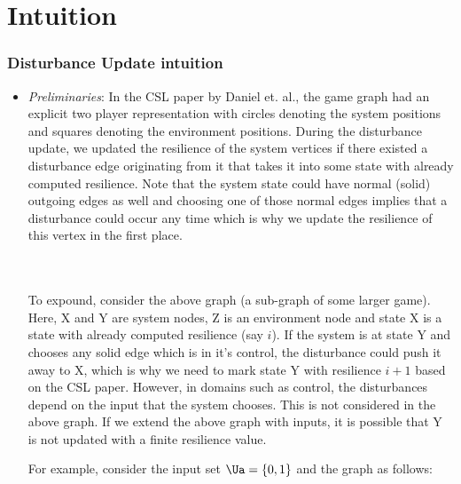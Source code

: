 \clearpage
\section{Intuition}
\subsubsection{Disturbance Update intuition}
\begin{itemize}	
\item \emph{Preliminaries}:
In the CSL paper by Daniel et. al., the game graph had an explicit two player representation with circles denoting the system positions and squares denoting the environment positions. During the disturbance update, we updated the resilience of the system vertices if there existed a disturbance edge originating from it that takes it into some state with already computed resilience. Note that the system state could have normal (solid) outgoing edges as well and choosing one of those normal edges implies that a disturbance could occur any time which is why we update the resilience of this vertex in the first place.
\\
\\ \\
To expound, consider the above graph (a sub-graph of some larger game). Here, X and Y are system nodes, Z is an environment node and state X is a state with already computed resilience (say $i$). If the system is at state Y and chooses any solid edge which is in it's control, the disturbance could push it away to X, which is why we need to mark state Y with resilience $i+1$ based on the CSL paper.
However, in domains such as control, the disturbances depend on the input that the system chooses. This is not considered in the above graph. If we extend the above graph with inputs, it is possible that Y is not updated with a finite resilience value.

For example, consider the input set $\Ua =\{0,1\}$ and the graph as follows:


\end{itemize}
